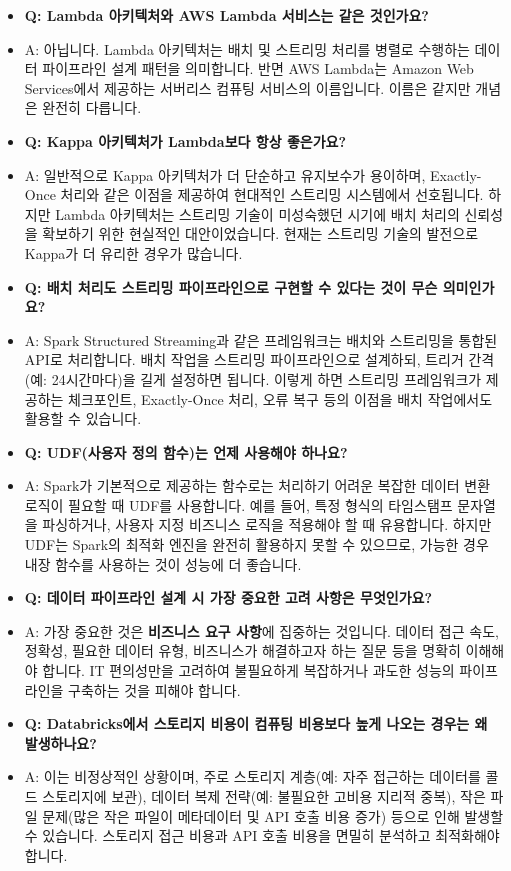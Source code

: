 \documentclass[11pt,a4paper]{article}
\theoremstyle{definition}
\begin{document}
\begin{itemize}
    \item \textbf{Q: Lambda 아키텍처와 AWS Lambda 서비스는 같은 것인가요?}
    \item A: 아닙니다. Lambda 아키텍처는 배치 및 스트리밍 처리를 병렬로 수행하는 데이터 파이프라인 설계 패턴을 의미합니다. 반면 AWS Lambda는 Amazon Web Services에서 제공하는 서버리스 컴퓨팅 서비스의 이름입니다. 이름은 같지만 개념은 완전히 다릅니다.

    \item \textbf{Q: Kappa 아키텍처가 Lambda보다 항상 좋은가요?}
    \item A: 일반적으로 Kappa 아키텍처가 더 단순하고 유지보수가 용이하며, Exactly-Once 처리와 같은 이점을 제공하여 현대적인 스트리밍 시스템에서 선호됩니다. 하지만 Lambda 아키텍처는 스트리밍 기술이 미성숙했던 시기에 배치 처리의 신뢰성을 확보하기 위한 현실적인 대안이었습니다. 현재는 스트리밍 기술의 발전으로 Kappa가 더 유리한 경우가 많습니다.

    \item \textbf{Q: 배치 처리도 스트리밍 파이프라인으로 구현할 수 있다는 것이 무슨 의미인가요?}
    \item A: Spark Structured Streaming과 같은 프레임워크는 배치와 스트리밍을 통합된 API로 처리합니다. 배치 작업을 스트리밍 파이프라인으로 설계하되, 트리거 간격(예: 24시간마다)을 길게 설정하면 됩니다. 이렇게 하면 스트리밍 프레임워크가 제공하는 체크포인트, Exactly-Once 처리, 오류 복구 등의 이점을 배치 작업에서도 활용할 수 있습니다.

    \item \textbf{Q: UDF(사용자 정의 함수)는 언제 사용해야 하나요?}
    \item A: Spark가 기본적으로 제공하는 함수로는 처리하기 어려운 복잡한 데이터 변환 로직이 필요할 때 UDF를 사용합니다. 예를 들어, 특정 형식의 타임스탬프 문자열을 파싱하거나, 사용자 지정 비즈니스 로직을 적용해야 할 때 유용합니다. 하지만 UDF는 Spark의 최적화 엔진을 완전히 활용하지 못할 수 있으므로, 가능한 경우 내장 함수를 사용하는 것이 성능에 더 좋습니다.

    \item \textbf{Q: 데이터 파이프라인 설계 시 가장 중요한 고려 사항은 무엇인가요?}
    \item A: 가장 중요한 것은 \textbf{비즈니스 요구 사항}에 집중하는 것입니다. 데이터 접근 속도, 정확성, 필요한 데이터 유형, 비즈니스가 해결하고자 하는 질문 등을 명확히 이해해야 합니다. IT 편의성만을 고려하여 불필요하게 복잡하거나 과도한 성능의 파이프라인을 구축하는 것을 피해야 합니다.

    \item \textbf{Q: Databricks에서 스토리지 비용이 컴퓨팅 비용보다 높게 나오는 경우는 왜 발생하나요?}
    \item A: 이는 비정상적인 상황이며, 주로 스토리지 계층(예: 자주 접근하는 데이터를 콜드 스토리지에 보관), 데이터 복제 전략(예: 불필요한 고비용 지리적 중복), 작은 파일 문제(많은 작은 파일이 메타데이터 및 API 호출 비용 증가) 등으로 인해 발생할 수 있습니다. 스토리지 접근 비용과 API 호출 비용을 면밀히 분석하고 최적화해야 합니다.
\end{itemize}
\end{document}
